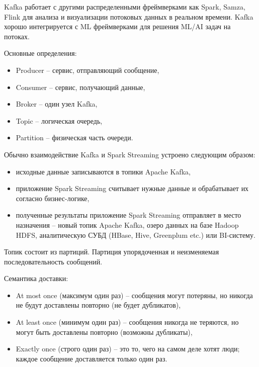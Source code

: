 \documentclass[%
	11pt,
	a4paper,
	utf8,
		]{article}
\begin{document}
Kafka работает с другими распределенными фреймверками как Spark, Samza, Flink для анализа и визуализации потоковых данных в реальном времени. Kafka хорошо интегрируется с ML фреймверками для решения ML/AI задач на потоках.

Основные определения:
\begin{itemize}
	\item Producer -- сервис, отправляющий сообщение,
	
	\item Consumer -- сервис, получающий данные,
	
	\item Broker -- один узел Kafka,
	
	\item Topic -- логическая очередь,
	
	\item Partition -- физическая часть очереди.
\end{itemize}

Обычно взаимодействие Kafka и Spark Streaming устроено следующим образом:
\begin{itemize}
	\item исходные данные записываются в топики Apache Kafka,
	
	\item приложение Spark Streaming считывает нужные данные и обрабатывает их согласно бизнес-логике,
	
	\item полученные результаты приложение Spark Streaming отправляет в место назначения -- новый топик Apache Kafka, озеро данных на базе Hadoop HDFS, аналитическую СУБД (HBase, Hive, Greenplum etc.) или BI-систему.
\end{itemize}

Топик состоит из партиций. Партиция упорядоченная и неизменяемая последовательность сообщений.

Семантика доставки:
\begin{itemize}
	\item At most once (максимум один раз) -- сообщения могут потеряны, но никогда не будут доставлены повторно (не будет дубликатов),
	
	\item At least once (минимум один раз) -- сообщения никогда не теряются, но могут быть доставлены повторно (возможны дубликаты),
	
	\item Exactly once (строго один раз) -- это то, чего на самом деле хотят люди; каждое сообщение доставляется только один раз.
\end{itemize}
\end{document}
